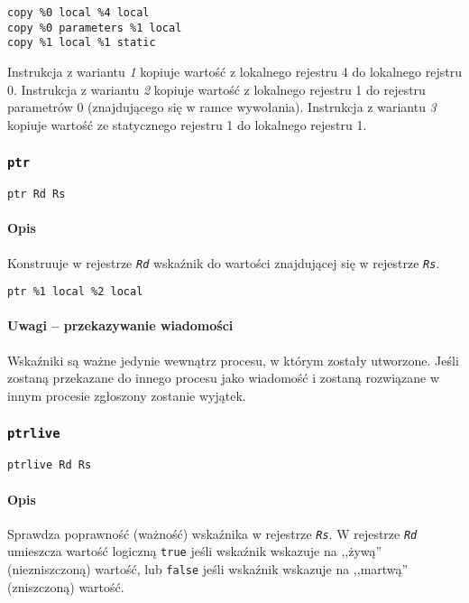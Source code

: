 \begin{lstlisting}
copy %0 local %4 local
copy %0 parameters %1 local
copy %1 local %1 static
\end{lstlisting}

Instrukcja z wariantu \emph{1} kopiuje wartość z lokalnego rejestru 4 do
lokalnego rejstru 0.
Instrukcja z wariantu \emph{2} kopiuje wartość z lokalnego rejestru 1 do
rejestru parametrów 0 (znajdującego się w ramce wywołania).
Instrukcja z wariantu \emph{3} kopiuje wartość ze statycznego rejestru 1 do
lokalnego rejestru 1.

\subsubsection{\texttt{ptr}}

\begin{lstlisting}
ptr Rd Rs
\end{lstlisting}

\paragraph*{Opis} Konstruuje w rejestrze \texttt{\emph{Rd}} wskaźnik do wartości
znajdującej się w rejestrze \texttt{\emph{Rs}}.

\begin{lstlisting}
ptr %1 local %2 local
\end{lstlisting}

\paragraph*{Uwagi -- przekazywanie wiadomości} Wskaźniki są ważne jedynie
wewnątrz procesu, w którym zostały utworzone. Jeśli zostaną przekazane do innego
procesu jako wiadomość i zostaną rozwiązane w innym procesie zgłoszony zostanie
wyjątek.

\subsubsection{\texttt{ptrlive}}

\begin{lstlisting}
ptrlive Rd Rs
\end{lstlisting}

\paragraph*{Opis} Sprawdza poprawność (ważność) wskaźnika w rejestrze
\texttt{\emph{Rs}}. W rejestrze \texttt{\emph{Rd}} umieszcza wartość logiczną
\texttt{true} jeśli wskaźnik wskazuje na ,,żywą'' (niezniszczoną) wartość, lub
\texttt{false} jeśli wskaźnik wskazuje na ,,martwą'' (zniszczoną) wartość.

